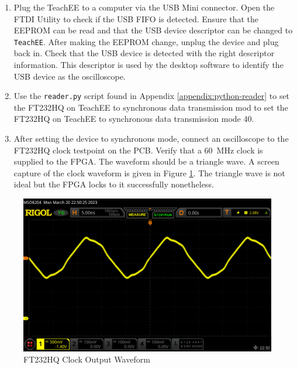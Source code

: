 \documentclass[letterpaper,11pt]{article}
\newcommand{\code}[1]{\texttt{#1}}
\begin{document}
\begin{enumerate}
  \item Plug the TeachEE to a computer via the USB Mini connector. Open the FTDI
    Utility to check if the USB FIFO is detected. Ensure that the EEPROM can be
    read and that the USB device descriptor can be changed to \code{TeachEE}.
    After making the EEPROM change, unplug the device and plug back in. Check
    that the USB device is detected with the right descriptor information. This
    descriptor is used by the desktop software to identify the USB device as the
    oscilloscope.
  \item Use the \code{reader.py} script found in Appendix
    \ref{appendix:python-reader} to set the FT232HQ on TeachEE to synchronous
    data transmission mod to set the FT232HQ on TeachEE to synchronous data
    transmission mode 40.
  \item After setting the device to synchronous mode, connect an oscilloscope to
    the FT232HQ clock testpoint on the PCB. Verify that a \SI{60}{\mega\hertz}
    clock is supplied to the FPGA. The waveform should be a triangle wave. A
    screen capture of the clock waveform is given in Figure \ref{fig:ftdi-clk}.
    The triangle wave is not ideal but the FPGA locks to it successfully
    nonetheless.

\end{enumerate}

\begin{figure}[H]
  \centering
  \includegraphics[width=\textwidth]{figures/ftdi-clk-cap.png}
  \caption{FT232HQ Clock Output Waveform}
  \label{fig:ftdi-clk}
\end{figure}
\end{document}

